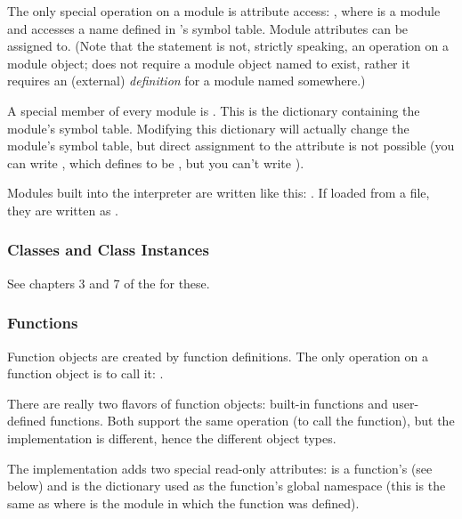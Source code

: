 The only special operation on a module is attribute access:
, where  is a module and 
accesses a name defined in 's symbol table.  Module attributes
can be assigned to.  (Note that the  statement is not,
strictly speaking, an operation on a module object;  does not require a module object named  to exist,
rather it requires an (external) \emph{definition} for a module named
 somewhere.)

A special member of every module is .
This is the dictionary containing the module's symbol table.
Modifying this dictionary will actually change the module's symbol
table, but direct assignment to the  attribute is not
possible (you can write , which
defines  to be , but you can't write
).

Modules built into the interpreter are written like this:
.  If loaded from a file, they are
written as .


\subsubsection{Classes and Class Instances \label{typesobjects}}

See chapters 3 and 7 of the  for these.


\subsubsection{Functions \label{typesfunctions}}

Function objects are created by function definitions.  The only
operation on a function object is to call it:
.

There are really two flavors of function objects: built-in functions
and user-defined functions.  Both support the same operation (to call
the function), but the implementation is different, hence the
different object types.

The implementation adds two special read-only attributes:
 is a function's  (see below) and  is
the dictionary used as the function's global namespace (this is the
same as  where  is the module in which
the function  was defined).

